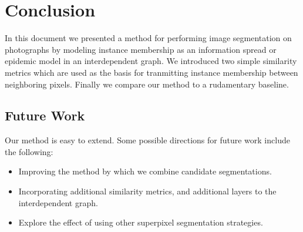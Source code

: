 \documentclass[twocolumn]{article}
\begin{document}
\section{Conclusion}

In this document we presented a method for performing image segmentation on photographs by modeling instance membership as
an information spread or epidemic model in an interdependent graph. We introduced two simple similarity metrics which are used
as the basis for tranmitting instance membership between neighboring pixels. Finally we compare our method to a rudamentary
baseline.

\subsection{Future Work}

Our method is easy to extend. Some possible directions for future work include the following:

\begin{itemize}
  \item Improving the method by which we combine candidate segmentations.
  \item Incorporating additional similarity metrics, and additional layers to the interdependent graph.
  \item Explore the effect of using other superpixel segmentation strategies.
\end{itemize}


 
\end{document}
